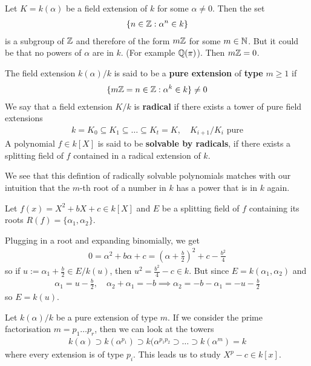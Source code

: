 Let $K = k(\alpha)$ be a field extension of $k$ for some $\alpha \neq0$. 
Then the set
\begin{align*}
  \{n \in \mathbb{Z}: \alpha^{n} \in k\}
\end{align*}
is a subgroup of $\mathbb{Z}$ and therefore of the form $m\mathbb{Z}$ for some $m \in \mathbb{N}$.
But it could be that no powers of $\alpha$ are in $k$. 
(For example $\mathbb{Q}(\pi)$).
Then $m\mathbb{Z} = 0$.

\begin{dfn}[]
  The field extension $k(\alpha)/k$ is said to be a \textbf{pure extension} of \textbf{type} $m \geq 1$ if
  \begin{align*}
    \{
    m\mathbb{Z} = n \in \mathbb{Z}: \alpha^{k} \in k
    \} \neq 0
  \end{align*}
  We say that a field extension $K/k$ is \textbf{radical} if there exists a tower of pure field extensions
  \begin{align*}
    k = K_0 \subseteq K_1 \subseteq \ldots \subseteq K_t = K,
    \quad K_{i+1}/K_i \text{ pure}
  \end{align*}
  A polynomial $f \in k[X]$ is said to be \textbf{solvable by radicals}, if there exists a splitting field of $f$ contained in a radical extension of $k$.
\end{dfn}

We see that this defintion of radically solvable polynomials matches with our intuition that the $m$-th root of a number in $k$ has a power that is in $k$ again.
\begin{ex}[]
  Let $f(x) =X^{2}+ b X + c \in k[X]$ and $E$ be a splitting field of $f$ containing its roots $R(f) = \{\alpha_1,\alpha_2\}$.

  Plugging in a root and expanding binomially, we get
  \begin{align*}
    0 = \alpha^{2} + b \alpha + c = \left(
      \alpha + \tfrac{b}{2}
    \right)^{2} + c - \tfrac{b^{2}}{4}
  \end{align*}
so if $u := \alpha_1 + \tfrac{b}{2} \in E/k(u)$, then $u^{2} = \tfrac{b^{2}}{4}- c \in k$.
But since $E = k(\alpha_1,\alpha_2)$ and
\begin{align*}
  \alpha_1 = u - \tfrac{b}{2}, \quad \alpha_2 + \alpha_1 = -b \implies \alpha_2 = -b - \alpha_1 = -u - \tfrac{b}{2}
\end{align*}
so $E = k(u)$.
\end{ex}


Let $k(\alpha)/k$ be a pure extension of type $m$. 
If we consider the prime factorisation $m = p_1 \ldots p_r$, then we can look at the towers
\begin{align*}
  k(\alpha) \supset k(\alpha^{p_1}) \supset k(\alpha^{p_1p_2} \supset \ldots \supset k(\alpha^{m}) = k
\end{align*}
where every extension is of type $p_i$.
This leads us to study $X^{p} - c \in k[x]$.

